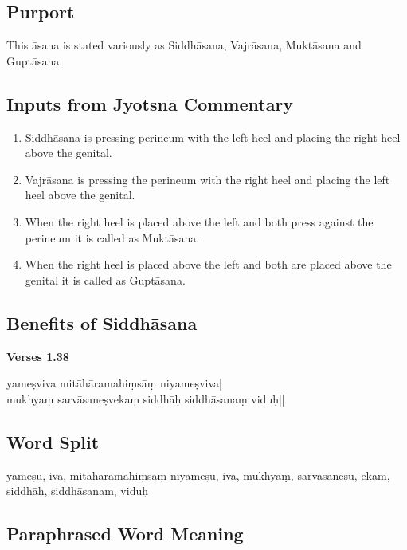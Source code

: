 \subsection*{Purport}
\vspace{-10pt}

This āsana is stated variously as Siddhāsana, Vajrāsana, Muktāsana and Guptāsana.

\subsection*{Inputs from Jyotsnā Commentary}

\begin{enumerate}
\itemsep=0pt
\item Siddhāsana is pressing perineum with the left heel and placing the right heel above the genital. 
\item Vajrāsana is pressing the perineum with the right heel and placing the left heel above the genital.
\item When the right heel is placed above the left and both press against the perineum it is called as Muktāsana.
\item When the right heel is placed above the left and both are placed above the genital it is called as Guptāsana.
\end{enumerate}
\newpage

\subsection*{Benefits of Siddhāsana}


\noindent \textbf{Verses 1.38}

\begin{shloka}
yameṣviva mitāhāramahiṃsāṃ niyameṣviva|\\
mukhyaṃ sarvāsaneṣvekaṃ siddhāḥ siddhāsanaṃ viduḥ||
\end{shloka}

\subsection*{Word Split}

yameṣu, iva, mitāhāramahiṃsāṃ niyameṣu, iva, mukhyaṃ, sarvāsaneṣu, ekam, siddhāḥ, siddhāsanam, viduḥ

\subsection*{Paraphrased Word Meaning}


